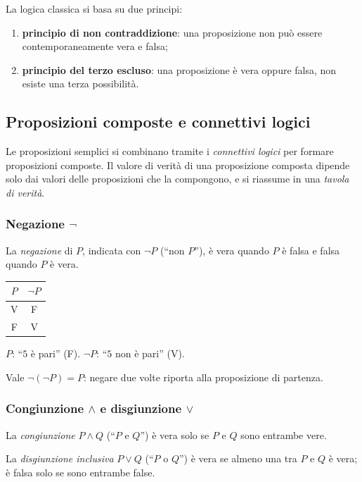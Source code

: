\documentclass[11pt,a4paper]{article}
\newcommand{\V}{\textsf{V}}
\newcommand{\F}{\textsf{F}}
\begin{document}
La logica classica si basa su due principi:
\begin{enumerate}
    \item \textbf{principio di non contraddizione}: una proposizione non può
          essere contemporaneamente vera e falsa;
    \item \textbf{principio del terzo escluso}: una proposizione è vera
          oppure falsa, non esiste una terza possibilità.
\end{enumerate}

\subsection{Proposizioni composte e connettivi logici}

Le proposizioni semplici si combinano tramite i \emph{connettivi logici}
per formare proposizioni composte. Il valore di verità di una proposizione
composta dipende solo dai valori delle proposizioni che la compongono, e si
riassume in una \emph{tavola di verità}.

\subsubsection{Negazione $\neg$}

\begin{definizione}
La \emph{negazione} di $P$, indicata con $\neg P$ (``non $P$''), è vera
quando $P$ è falsa e falsa quando $P$ è vera.
\end{definizione}

\begin{center}
\begin{tabular}{c|c}
$P$ & $\neg P$ \\ \hline
\V & \F \\
\F & \V
\end{tabular}
\end{center}

\begin{esempio}
$P$: ``$5$ è pari'' (\F). \quad $\neg P$: ``$5$ non è pari'' (\V).
\end{esempio}

Vale $\neg(\neg P) = P$: negare due volte riporta alla proposizione di
partenza.

\subsubsection{Congiunzione $\land$ e disgiunzione $\lor$}

\begin{definizione}
La \emph{congiunzione} $P \land Q$ (``$P$ e $Q$'') è vera solo se $P$ e $Q$
sono entrambe vere.

La \emph{disgiunzione inclusiva} $P \lor Q$ (``$P$ o $Q$'') è vera se
almeno una tra $P$ e $Q$ è vera; è falsa solo se sono entrambe false.
\end{definizione}
\end{document}
